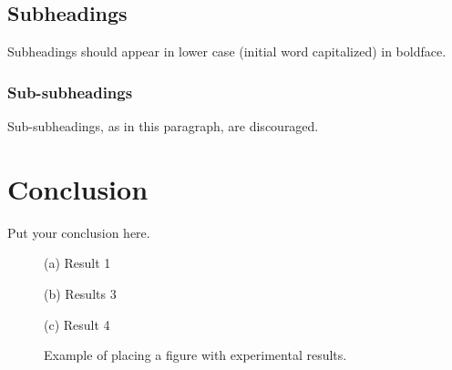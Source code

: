 \documentclass{article}
\begin{document}
\subsection{Subheadings}

Subheadings should appear in lower case (initial word capitalized) in boldface.

\subsubsection{Sub-subheadings}

Sub-subheadings, as in this paragraph, are discouraged.

\section{Conclusion}
\label{sec:conclusion}

Put your conclusion here.


\begin{figure}

\begin{minipage}[b]{1.0\linewidth}
  \centering
\centerline{}
  \centerline{(a) Result 1}\medskip
\end{minipage}
%
\begin{minipage}[b]{.48\linewidth}
  \centering
\centerline{}
  \centerline{(b) Results 3}\medskip
\end{minipage}
\hfill
\begin{minipage}[b]{0.48\linewidth}
  \centering
  \vspace{1.5cm}
  \centerline{(c) Result 4}\medskip
\end{minipage}
%
\caption{Example of placing a figure with experimental results.}
\label{fig:res}
%
\end{figure}

\vfill
\pagebreak




\end{document}
